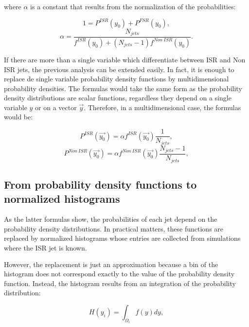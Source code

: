 \documentclass[12pt, oneside]{book}              %
\begin{document}
\noindent where $ \alpha $ is a constant that results from the normalization of the probabilities:

\begin{equation} \label{eq:Normalization}
1 = P^{ISR}(y_0) + P^{FSR}(y_0),
\end{equation}
\begin{equation} \label{eq:alpha}
\alpha = \dfrac{N_{jets}}{f^{ISR}(y_0)+(N_{jets}-1)f^{Non\ ISR}(y_0)}.
\end{equation}

If there are more than a single variable which differentiate between ISR and Non ISR jets, 
the previous analysis can be extended easily. In fact, it is enough to replace de single 
variable probability density functions by multidimensional probability densities. The formulas 
would take the same form as the probability density distributions are scalar functions, 
regardless they depend on a single variable $ y $ or on a vector $ \vec{y} $. Therefore, in 
a multidimensional case, the formulas would be:

\begin{equation} \label{eq:Prob_ISR_vec}
P^{ISR}(\vec{y_0}) = \alpha f^{ISR}(\vec{y_0}) \frac{1}{N_{jets}},
\end{equation}
\begin{equation} \label{eq:Prob_Non_ISR_vec}
P^{Non\ ISR}(\vec{y_0}) = \alpha f^{Non\ ISR}(\vec{y_0}) \frac{N_{jets}-1}{N_{jets}},
\end{equation}

\subsection{From probability density functions to normalized histograms} \label{sec:Histos}

As the latter formulas show, the probabilities of each jet depend on the probability density 
distributions. In practical matters, these functions are replaced by normalized histograms whose 
entries are collected from simulations where the ISR jet is known. 

However, the replacement is just an approximation because a bin of the histogram does not correspond
exactly to the value of the probability density function. Instead, the histogram results from an
integration of the probability distribution:

\begin{equation} \label{eq:histo}
H(y_i) = \int_{\Omega_i} f(y)dy,
\end{equation}
\end{document}
